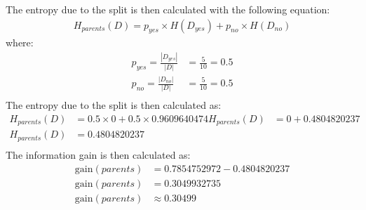 \documentclass[10pt]{article}
\begin{document}
The entropy due to the split is then calculated with the following equation:
\begin{align*}
    H_{parents}(D) = p_{yes} \times H(D_{yes}) + p_{no} \times H(D_{no})
\end{align*}
where:
\begin{align*}
    p_{yes} = \frac{|D_{yes}|}{|D|} &= \frac{5}{10} = 0.5\\
    p_{no} = \frac{|D_{no}|}{|D|} &= \frac{5}{10} = 0.5\\
\end{align*}
The entropy due to the split is then calculated as:
\begin{align*}
    H_{parents}(D) &= 0.5 \times 0 + 0.5 \times 0.9609640474
    H_{parents}(D) &= 0 + 0.4804820237 \\
    H_{parents}(D) &= 0.4804820237 \\
\end{align*}
The information gain is then calculated as:
\begin{align*}
    \text{gain}(parents) &= 0.7854752972 - 0.4804820237 \\
    \text{gain}(parents) &= 0.3049932735 \\
    \text{gain}(parents) &\approx 0.30499
\end{align*}
\end{document}
